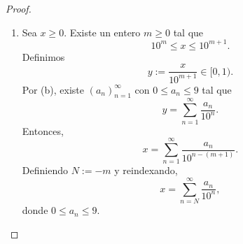 \documentclass[12pt,a4paper]{article}
\begin{document}
\begin{proof}
\begin{enumerate}
            \begin{equation*}
                0\leq\frac{r_{n}}{10^{n}}\leq\frac{1}{10^{n}}\to0.
            \end{equation*}
            Por lo tanto,
            \begin{equation*}
                x=\sum_{n=1}^{\infty}\frac{a_{n}}{10^{n}}.
            \end{equation*}
            \item[(c)]
            Sea $x\geq0$. Existe un entero $m\geq0$ tal que
            \begin{equation*}
                10^{m}\leq x\leq10^{m+1}.
            \end{equation*}
            Definimos
            \begin{equation*}
                y:=\frac{x}{10^{m+1}}\in[0,1).
            \end{equation*}
            Por (b), existe $(a_{n})_{n=1}^{\infty}$ con $0\leq a_{n}\leq9$ tal que
            \begin{equation*}
                y=\sum_{n=1}^{\infty}\frac{a_{n}}{10^{n}}.
            \end{equation*}
            Entonces,
            \begin{equation*}
                x=\sum_{n=1}^{\infty}\frac{a_{n}}{10^{n-(m+1)}}.
            \end{equation*}
            Definiendo $N:=-m$ y reindexando,
            \begin{equation*}
                x=\sum_{n=N}^{\infty}\frac{a_{n}}{10^{n}},
            \end{equation*}
            donde $0\leq a_{n}\leq9$.
        \end{enumerate}
    \end{proof}
\end{document}
